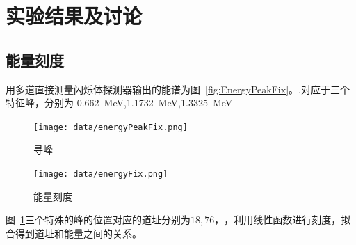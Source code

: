 \documentclass[10pt]{ctexart}
\begin{document}
\section{实验结果及讨论}
\subsection{能量刻度}
用多道直接测量闪烁体探测器输出的能谱为图~\ref{fig:EnergyPeakFix}。,对应于三个特征峰，分别为
\SI{0.662}{MeV},\SI{1.1732}{MeV},\SI{1.3325}{MeV}
\begin{figure}[htbp]
    \centering
    \begin{minipage}{0.45\textwidth}
        \centering
        \texttt{[image: data/energyPeakFix.png]}
        \caption{寻峰}
        \label{fig:EnergyPeakFix}
    \end{minipage}
    \qquad
    \begin{minipage}{0.45\textwidth}
        \centering
        \texttt{[image: data/energyFix.png]}
        \caption{能量刻度}
        \label{fig:EnergyFix}
    \end{minipage}
\end{figure}
图~\ref{fig:EnergyFix}三个特殊的峰的位置对应的道址分别为$18,76，$，利用线性函数进行刻度，拟合得到道址和能量之间的关系。
\[\]
\end{document}
